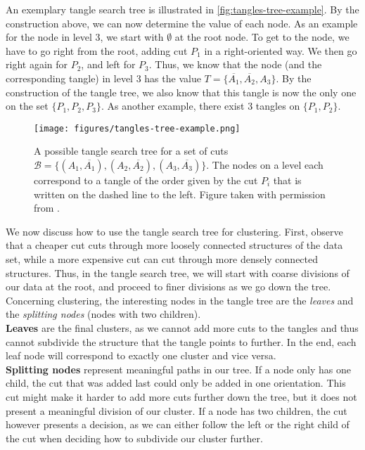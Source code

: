 An exemplary tangle search tree is illustrated in \autoref{fig:tangles-tree-example}. 
By the construction above, we can now determine the value of each node. 
As an example for the node in level 3, we start with $\emptyset$ at the root node. To
get to the node, we have to go right from the root, adding cut $P_1$ in a right-oriented
way. We then go right again for $P_2$, and left for $P_3$. Thus, we know that the node (and the 
corresponding tangle) in level 3 has the value $T = \{\overline{A_1}, \overline{A_2}, A_3\}$. 
By the construction of the tangle tree, we also know that this tangle is now the only one on
the set $\{P_1, P_2, P_3\}$. As another example, there exist 3 tangles on $\{P_1, P_2\}$.


\begin{figure}[h]
    \centering
    \texttt{[image: figures/tangles-tree-example.png]}
    \caption{A possible tangle search tree for a set of cuts $\mathcal{B} = \{(A_1, \overline{A_1}), (A_2, \overline{A_2}), (A_3, \overline{A_3}) \}$. 
        The nodes on a level each correspond to a tangle of the order given by the cut $P_i$ that is written on the dashed line to the left.
        Figure taken with permission from \cite{klepperClusteringTanglesAlgorithmic2021}.}
    \label{fig:tangles-tree-example}
\end{figure}

We now discuss how to use the tangle search tree for clustering. 
First, observe that a cheaper cut cuts through more loosely connected structures
of the data set, while a more expensive cut can cut through more densely connected structures.
Thus, in the tangle search tree, we will start with coarse divisions of our data
at the root, and proceed to finer divisions as we go down the tree. Concerning clustering, the interesting nodes in the tangle tree are the \textit{leaves} and
the \textit{splitting nodes} (nodes with two children). \\
\textbf{Leaves} are the final clusters, as we cannot add more cuts to the tangles and thus cannot subdivide the structure that the tangle points to further. In the end, 
each leaf node will correspond to exactly one cluster and vice versa.\\
\textbf{Splitting nodes} represent meaningful paths in our tree. If a node only has one child,
the cut that was added last could only be added in one orientation. This cut might make it harder to add more cuts further down the tree, but it does not present
a meaningful division of our cluster. If a node has two children, 
the cut however presents a decision, as we can either follow the left or the right
child of the cut when deciding how to subdivide our cluster further. 

